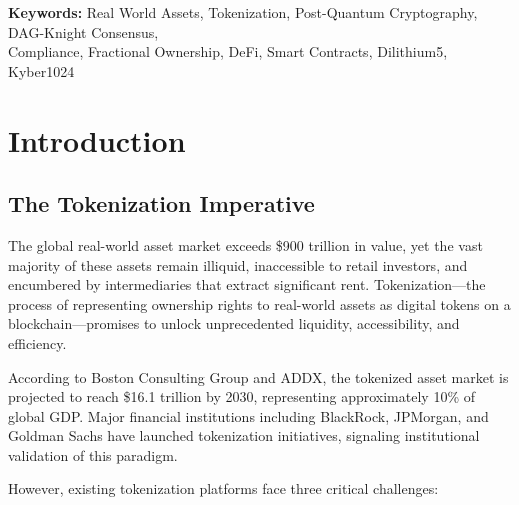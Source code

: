 \documentclass[11pt,a4paper,twoside]{article}
\begin{document}
\begin{titlepage}
\begin{center}
\vspace{1cm}

{\small\color{gray}
\textbf{Keywords:} Real World Assets, Tokenization, Post-Quantum Cryptography, DAG-Knight Consensus,\\
Compliance, Fractional Ownership, DeFi, Smart Contracts, Dilithium5, Kyber1024
}

\end{center}
\end{titlepage}

\newpage
\tableofcontents
\newpage

\section{Introduction}
\label{sec:introduction}

\subsection{The Tokenization Imperative}

The global real-world asset market exceeds \$900 trillion in value, yet the vast majority of these assets remain illiquid, inaccessible to retail investors, and encumbered by intermediaries that extract significant rent. Tokenization---the process of representing ownership rights to real-world assets as digital tokens on a blockchain---promises to unlock unprecedented liquidity, accessibility, and efficiency.

According to Boston Consulting Group and ADDX, the tokenized asset market is projected to reach \$16.1 trillion by 2030, representing approximately 10\% of global GDP. Major financial institutions including BlackRock, JPMorgan, and Goldman Sachs have launched tokenization initiatives, signaling institutional validation of this paradigm.

However, existing tokenization platforms face three critical challenges:
\end{document}
